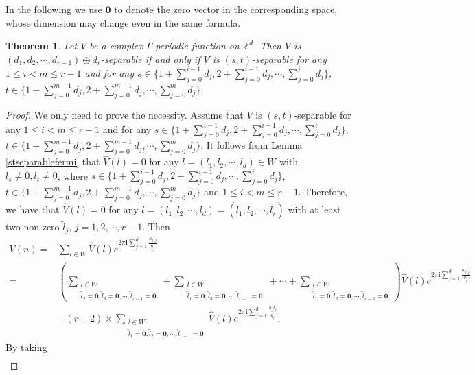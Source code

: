 \documentclass[12pt,letterpaper]{amsart}
\newtheorem{theorem}{Theorem}[section]
\begin{document}
In the following we use $\mathbf{0}$ to denote the zero vector in the corresponding space, whose dimension may change {even in the same formula}.

{\begin{theorem}\label{theoremoplussp}
	Let $V$ be a complex $\Gamma$-periodic function on $\mathbb{Z}^d$. Then $V$ is $(d_1,d_2,\cdots,d_{r-1})\oplus d_r$-separable if and only if
	$V$ is $(s,t)$-separable for any $1\leq i<m\leq r-1$ and for any $s\in \{1+\sum_{j=0}^{i-1}d_j,2+\sum_{j=0}^{i-1}d_j,\cdots,\sum_{j=0}^{i}d_j\}$, $t\in \{1+\sum_{j=0}^{m-1}d_j,2+\sum_{j=0}^{m-1}d_j,\cdots,\sum_{j=0}^{m}d_j\}$.
\end{theorem}
\begin{proof}
	We only need to prove the necessity. Assume that $V$ is $(s,t)$-separable for any $1\leq i<m\leq r-1$ and for any $s\in \{1+\sum_{j=0}^{i-1}d_j,2+\sum_{j=0}^{i-1}d_j,\cdots,\sum_{j=0}^{i}d_j\}$, $t\in \{1+\sum_{j=0}^{m-1}d_j,2+\sum_{j=0}^{m-1}d_j,\cdots,\sum_{j=0}^{m}d_j\}$.
	 It follows from Lemma \ref{stseparablefermi} that $\hat{V}(l)=0$ for any $l=(l_1,l_2,\cdots,l_d)\in W$ with $l_s\neq 0,l_t\neq 0$, where $s\in \{1+\sum_{j=0}^{i-1}d_j,2+\sum_{j=0}^{i-1}d_j,\cdots,\sum_{j=0}^{i}d_j\}$, $t\in \{1+\sum_{j=0}^{m-1}d_j,2+\sum_{j=0}^{m-1}d_j,\cdots,\sum_{j=0}^{m}d_j\}$ and $1\leq i<m\leq r-1$. Therefore, we have that $\hat{V}(l)=0$ for any $l=(l_1,l_2,\cdots,l_d)=(\tilde{l}_1,\tilde{l}_2,\cdots,\tilde{l}_r)$ with at least two non-zero $\tilde{l}_j$, $j=1,2,\cdots,r-1$. Then
\begin{align}
	V(n)=&\sum_{l\in W}\hat{V}(l)e^{2\pi\mathbf{i}\sum_{j=1}^d\frac{n_jl_j}{q_j}}\nonumber\\
	=&\left(\sum_{\substack{l\in W\\ \tilde{l}_2=\mathbf{0},\tilde{l}_3=\mathbf{0},\cdots,\tilde{l}_{r-1}=\mathbf{0}}}+\sum_{\substack{l\in W\\ \tilde{l}_1=\mathbf{0},\tilde{l}_3=\mathbf{0},\cdots,\tilde{l}_{r-1}=\mathbf{0}}}+\cdots+\sum_{\substack{l\in W\\ \tilde{l}_1=\mathbf{0},\tilde{l}_2=\mathbf{0},\cdots,\tilde{l}_{r-2}=\mathbf{0}}}\right)\hat{V}(l)e^{2\pi\mathbf{i}\sum_{j=1}^d\frac{n_jl_j}{q_j}}\nonumber\\
	&-(r-2)\times\sum_{\substack{l\in W\\ \tilde{l}_1=\mathbf{0},\tilde{l}_2=\mathbf{0},\cdots,\tilde{l}_{r-1}=\mathbf{0}}}\hat{V}(l)e^{2\pi\mathbf{i}\sum_{j=1}^d\frac{n_jl_j}{q_j}}.\nonumber
\end{align}
By taking
\begin{align}

\end{align}
\end{proof}}
\end{document}

